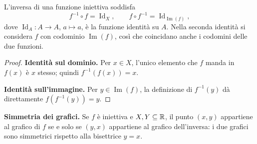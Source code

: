 \begin{proposizione}
L'inversa di una funzione iniettiva soddisfa
\[
f^{-1}\circ f=\operatorname{Id}_X,
\qquad f\circ f^{-1}=\operatorname{Id}_{\operatorname{Im}(f)},
\]
dove $\operatorname{Id}_A\colon A\to A$, $a\mapsto a$, è la funzione identità su $A$. Nella seconda identità si considera $f$ con codominio $\operatorname{Im}(f)$, così che coincidano anche i codomini delle due funzioni.
\end{proposizione}
\begin{proof}
\textbf{Identità sul dominio.} Per $x\in X$, l'unico elemento che $f$ manda in $f(x)$ è $x$ stesso; quindi $f^{-1}(f(x))=x$.

\textbf{Identità sull’immagine.} Per $y\in\operatorname{Im}(f)$, la definizione di $f^{-1}(y)$ dà direttamente $f(f^{-1}(y))=y$.
\end{proof}

\textbf{Simmetria dei grafici.} Se $f$ è iniettiva e $X,Y\subseteq\mathbb{R}$, il punto $(x,y)$ appartiene al grafico di $f$ se e solo se $(y,x)$ appartiene al grafico dell'inversa: i due grafici sono simmetrici rispetto alla bisettrice $y=x$.

\begin{schema}
\end{schema}


